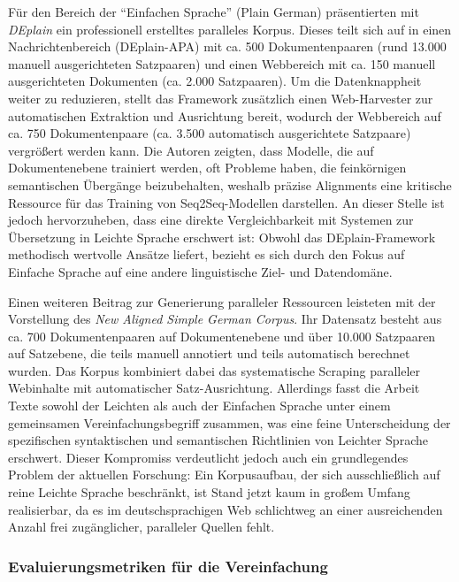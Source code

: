 Für den Bereich der "`Einfachen Sprache"' (Plain German) präsentierten \citet{stodden2023deplain} mit \textit{DEplain} ein professionell erstelltes paralleles Korpus. Dieses teilt sich auf in einen Nachrichtenbereich (DEplain-APA) mit ca. 500 Dokumentenpaaren (rund 13.000 manuell ausgerichteten Satzpaaren) und einen Webbereich mit ca. 150 manuell ausgerichteten Dokumenten (ca. 2.000 Satzpaaren). Um die Datenknappheit weiter zu reduzieren, stellt das Framework zusätzlich einen Web-Harvester zur automatischen Extraktion und Ausrichtung bereit, wodurch der Webbereich auf ca. 750 Dokumentenpaare (ca. 3.500 automatisch ausgerichtete Satzpaare) vergrößert werden kann. Die Autoren zeigten, dass Modelle, die auf Dokumentenebene trainiert werden, oft Probleme haben, die feinkörnigen semantischen Übergänge beizubehalten, weshalb präzise Alignments eine kritische Ressource für das Training von Seq2Seq-Modellen darstellen. An dieser Stelle ist jedoch hervorzuheben, dass eine direkte Vergleichbarkeit mit Systemen zur Übersetzung in Leichte Sprache erschwert ist: Obwohl das DEplain-Framework methodisch wertvolle Ansätze liefert, bezieht es sich durch den Fokus auf Einfache Sprache auf eine andere linguistische Ziel- und Datendomäne.

Einen weiteren Beitrag zur Generierung paralleler Ressourcen leisteten \citet{toborek2023new} mit der Vorstellung des \textit{New Aligned Simple German Corpus}. Ihr Datensatz besteht aus ca. 700 Dokumentenpaaren auf Dokumentenebene und über 10.000 Satzpaaren auf Satzebene, die teils manuell annotiert und teils automatisch berechnet wurden. Das Korpus kombiniert dabei das systematische Scraping paralleler Webinhalte mit automatischer Satz-Ausrichtung. Allerdings fasst die Arbeit Texte sowohl der Leichten als auch der Einfachen Sprache unter einem gemeinsamen Vereinfachungsbegriff zusammen, was eine feine Unterscheidung der spezifischen syntaktischen und semantischen Richtlinien von Leichter Sprache erschwert. Dieser Kompromiss verdeutlicht jedoch auch ein grundlegendes Problem der aktuellen Forschung: Ein Korpusaufbau, der sich ausschließlich auf reine Leichte Sprache beschränkt, ist Stand jetzt kaum in großem Umfang realisierbar, da es im deutschsprachigen Web schlichtweg an einer ausreichenden Anzahl frei zugänglicher, paralleler Quellen fehlt.

\subsubsection{Evaluierungsmetriken für die Vereinfachung}
\label{sec:evaluierungsmetriken}

